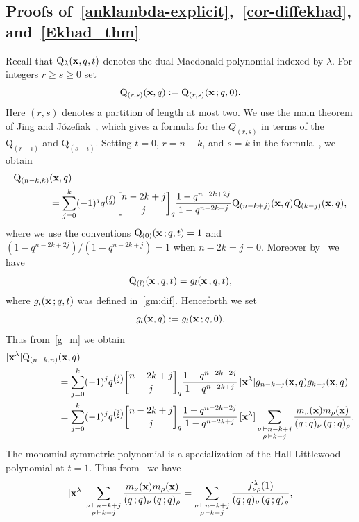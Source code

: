 \documentclass[12pt,a4paper,reqno]{amsart}
\theoremstyle{plain}
\theoremstyle{definition}
\newcommand{\1}{\mathds{1}}
\newcommand{\Q}{\mathrm{Q}}
\newcommand{\x}{{\bf x}}
\begin{document}
\subsection{Proofs of~\cref{anklambda-explicit},~\cref{cor-diffekhad}, and~\cref{Ekhad_thm}} 
Recall that $\Q_\lambda(\x,q,t)$ denotes the dual Macdonald polynomial indexed by $\lambda$. For integers $r\geq s\geq 0$
set \[\Q_{(r,s)}(\x,q):=\Q_{(r,s)}(\x\, ;q,0).\]
Here $(r,s)$ denotes a partition of length at most two. 
We use the main theorem of 
Jing and J\'{o}zefiak~\cite[Eq. (1)]{Jing}, which gives a formula for the $Q_{(r,s)}$  
in terms of the $\Q_{(r+i)}$ and $\Q_{(s-i)}$. Setting $t=0$, $r=n-k$, and $s=k$ in the formula~\cite[Eq. (1)]{Jing}, we obtain 
\begin{align}\label{reu_Mac}
    \Q_{(n-k,k)}&(\x,q)\\
    &= \sum_{j=0}^k (-1)^jq^{\binom{j}{2}}{n-2k+j \brack j}_q\frac{1-q^{n-2k+2j}}{1-q^{n-2k+j}}\Q_{(n-k+j)}(\x,q)\Q_{(k-j)}(\x,q),
    \notag
\end{align}
where we use the conventions 
$\Q_{(0)}(\x\, ;q,t)=1$ and
 $(1-q^{n-2k+2j})/(1-q^{n-2k+j})=1$ when $n-2k=j=0$. Moreover by~\cite[p. 329, Eq. (2.9)]{Macdonald}  we have
$$\Q_{(l)}(\x\, ;q,t)=g_l(\x\, ;q,t),$$
where $g_l(\x\, ;q,t)$ was defined in~\cref{gm:dif}. Henceforth we set 
\[g_{l}(\x,q):=g_{l}(\x\, ;q,0).
\]
Thus from~\cref{g_m} we obtain
\begin{equation*}
\begin{split}
    [\x^\lambda]\Q_{(n-k,n)}&(\x,q)\\
    &=\sum_{j=0}^k (-1)^jq^{\binom{j}{2}}{n-2k+j \brack j}_q\frac{1-q^{n-2k+2j}}{1-q^{n-2k+j}}\, [\x^\lambda]g_{n-k+j}(\x,q)g_{k-j}(\x,q)\\
    &=\sum_{j=0}^k (-1)^jq^{\binom{j}{2}}{n-2k+j \brack j}_q\frac{1-q^{n-2k+2j}}{1-q^{n-2k+j}}\, [\x^\lambda]\sum_{\substack{\nu\, \vdash n-k+j\\ \rho\, \vdash k-j}}\frac{m_{\nu}(\x)m_\rho(\x)}{(q\, ;q)_\nu\,(q\, ;q)_\rho}.
\end{split}
\end{equation*}
The monomial symmetric polynomial is a specialization of the Hall-Littlewood polynomial at $t=1$. Thus from~\cite[Sec. III.3, p. 215]{Macdonald} we have 
$$
[\x^\lambda]\sum_{\substack{\nu\, \vdash n-k+j\\ \rho\, \vdash k-j}}\frac{m_{\nu}(\x)m_\rho(\x)}{(q\, ;q)_\nu\,(q\, ;q)_\rho}=\sum_{\substack{\nu\, \vdash n-k+j\\ \rho\, \vdash k-j}}\frac{f_{\nu\rho}^\lambda(1)}{(q\, ;q)_\nu\,(q\, ;q)_\rho},
$$
\end{document}
